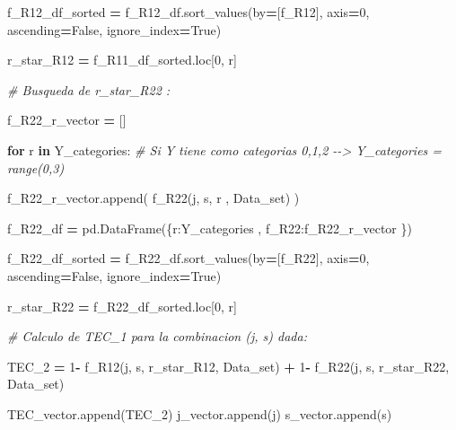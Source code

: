 \documentclass[
  11pt,
  a4paper,
]{article}
\newenvironment{Shaded}{\begin{snugshade}}{\end{snugshade}}
\newcommand{\CommentTok}[1]{\textcolor[rgb]{0.56,0.35,0.01}{\textit{#1}}}
\newcommand{\ControlFlowTok}[1]{\textcolor[rgb]{0.13,0.29,0.53}{\textbf{#1}}}
\newcommand{\DecValTok}[1]{\textcolor[rgb]{0.00,0.00,0.81}{#1}}
\newcommand{\KeywordTok}[1]{\textcolor[rgb]{0.13,0.29,0.53}{\textbf{#1}}}
\newcommand{\NormalTok}[1]{#1}
\newcommand{\OperatorTok}[1]{\textcolor[rgb]{0.81,0.36,0.00}{\textbf{#1}}}
\newcommand{\StringTok}[1]{\textcolor[rgb]{0.31,0.60,0.02}{#1}}
\newcommand{\VariableTok}[1]{\textcolor[rgb]{0.00,0.00,0.00}{#1}}
\begin{document}
\begin{Shaded}
\begin{Highlighting}[]
\NormalTok{                f\_R12\_df\_sorted }\OperatorTok{=}\NormalTok{ f\_R12\_df.sort\_values(by}\OperatorTok{=}\NormalTok{[}\StringTok{\textquotesingle{}f\_R12\textquotesingle{}}\NormalTok{], axis}\OperatorTok{=}\DecValTok{0}\NormalTok{, ascending}\OperatorTok{=}\VariableTok{False}\NormalTok{, ignore\_index}\OperatorTok{=}\VariableTok{True}\NormalTok{)}

\NormalTok{                r\_star\_R12 }\OperatorTok{=}\NormalTok{ f\_R11\_df\_sorted.loc[}\DecValTok{0}\NormalTok{, }\StringTok{\textquotesingle{}r\textquotesingle{}}\NormalTok{]}


                \CommentTok{\# Busqueda de r\_star\_R22 :}

\NormalTok{                f\_R22\_r\_vector }\OperatorTok{=}\NormalTok{ []}

                \ControlFlowTok{for}\NormalTok{ r }\KeywordTok{in}\NormalTok{ Y\_categories:  }\CommentTok{\# Si Y tiene como categorias 0,1,2 {-}{-}\textgreater{} Y\_categories = range(0,3)}

\NormalTok{                    f\_R22\_r\_vector.append( f\_R22(j, s, r , Data\_set) )}

\NormalTok{                f\_R22\_df }\OperatorTok{=}\NormalTok{ pd.DataFrame(\{}\StringTok{\textquotesingle{}r\textquotesingle{}}\NormalTok{:Y\_categories , }\StringTok{\textquotesingle{}f\_R22\textquotesingle{}}\NormalTok{:f\_R22\_r\_vector \})}
        
\NormalTok{                f\_R22\_df\_sorted }\OperatorTok{=}\NormalTok{ f\_R22\_df.sort\_values(by}\OperatorTok{=}\NormalTok{[}\StringTok{\textquotesingle{}f\_R22\textquotesingle{}}\NormalTok{], axis}\OperatorTok{=}\DecValTok{0}\NormalTok{, ascending}\OperatorTok{=}\VariableTok{False}\NormalTok{, ignore\_index}\OperatorTok{=}\VariableTok{True}\NormalTok{)}

\NormalTok{                r\_star\_R22 }\OperatorTok{=}\NormalTok{ f\_R22\_df\_sorted.loc[}\DecValTok{0}\NormalTok{, }\StringTok{\textquotesingle{}r\textquotesingle{}}\NormalTok{]}


                \CommentTok{\# Calculo de TEC\_1 para la combinacion (j, s) dada:}

\NormalTok{                TEC\_2 }\OperatorTok{=} \DecValTok{1}\OperatorTok{{-}}\NormalTok{ f\_R12(j, s, r\_star\_R12, Data\_set) }\OperatorTok{+} \DecValTok{1}\OperatorTok{{-}}\NormalTok{ f\_R22(j, s, r\_star\_R22, Data\_set)}

\NormalTok{                TEC\_vector.append(TEC\_2)}
\NormalTok{                j\_vector.append(j)}
\NormalTok{                s\_vector.append(s)}



\end{Highlighting}
\end{Shaded}
\end{document}
